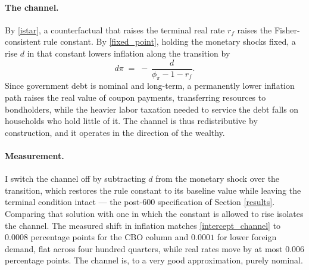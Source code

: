 \paragraph{The channel.} By \eqref{istar}, a counterfactual that raises the
terminal real rate $r_f$ raises the Fisher-consistent rule constant. By
\eqref{fixed_point}, holding the monetary shocks fixed, a rise $d$ in that
constant lowers inflation along the transition by
\begin{equation}\label{intercept_channel}
  d\pi \;=\; -\,\frac{d}{\phi_\pi - 1 - r_f}.
\end{equation}
Since government debt is nominal and long-term, a permanently lower inflation
path raises the real value of coupon payments, transferring resources to
bondholders, while the heavier labor taxation needed to service the debt falls
on households who hold little of it. The channel is thus redistributive by
construction, and it operates in the direction of the wealthy.

\paragraph{Measurement.} I switch the channel off by subtracting $d$ from the
monetary shock over the transition, which restores the rule constant to its
baseline value while leaving the terminal condition intact --- the post-600
specification of Section \ref{results}. Comparing that solution with one in
which the constant is allowed to rise isolates the channel. The measured shift
in inflation matches \eqref{intercept_channel} to $0.0008$ percentage points for
the CBO column and $0.0001$ for lower foreign demand, flat across four hundred
quarters, while real rates move by at most $0.006$ percentage points. The
channel is, to a very good approximation, purely nominal.

